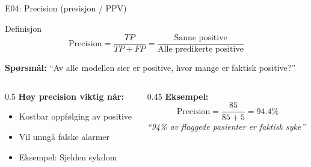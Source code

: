 \documentclass[aspectratio=169, 10pt]{beamer}
\begin{document}
\begin{frame}{E04: Precision (presisjon / PPV)}
    
    \begin{block}{Definisjon}
        \[
        \text{Precision} = \frac{TP}{TP + FP} = \frac{\text{Sanne positive}}{\text{Alle predikerte positive}}
        \]
    \end{block}
    
    \vspace{3mm}
    
    \textbf{Spørsmål:} ``Av alle modellen sier er positive, hvor mange er faktisk positive?''
    
    \vspace{3mm}
    
    \begin{columns}
        \begin{column}{0.5\textwidth}
            \textbf{Høy precision viktig når:}
            \begin{itemize}
                \item Kostbar oppfølging av positive
                \item Vil unngå falske alarmer
                \item Eksempel: Sjelden sykdom
            \end{itemize}
        \end{column}
        
        \begin{column}{0.45\textwidth}
            \textbf{Eksempel:}
            \[
            \text{Precision} = \frac{85}{85 + 5} = 94.4\%
            \]
            \footnotesize\textit{``94\% av flaggede pasienter er faktisk syke''}
        \end{column}
    \end{columns}
    
\end{frame}
\end{document}
